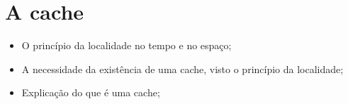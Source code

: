 \section{A cache}

    \begin{itemize}
        \item O princípio da localidade no tempo e no espaço;
        \item A necessidade da existência de uma cache, visto o 
        princípio da localidade;
        \item Explicação do que é uma cache;
    \end{itemize}